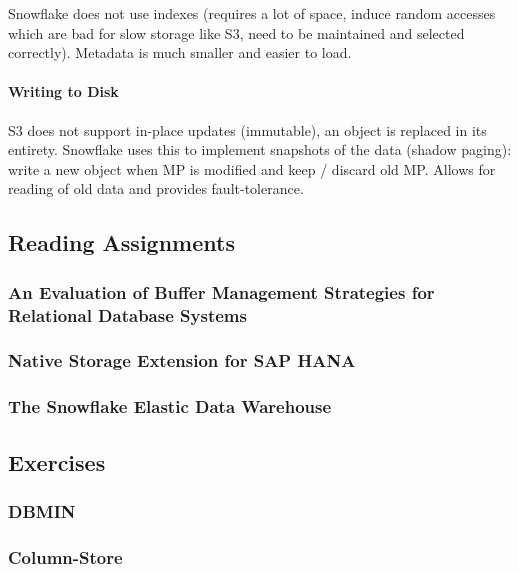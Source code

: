 Snowflake does not use indexes (requires a lot of space, induce random accesses which are bad for slow storage like S3, need to be maintained and selected correctly). Metadata is much smaller and easier to load.

\paragraph{Writing to Disk}
S3 does not support in-place updates (immutable), an object is replaced in its entirety. Snowflake uses this to implement snapshots of the data (shadow paging): write a new object when MP is modified and keep / discard old MP. Allows for reading of old data and provides fault-tolerance.



\subsection{Reading Assignments}

\subsubsection{An Evaluation of Buffer Management Strategies for Relational Database Systems}

\subsubsection{Native Storage Extension for SAP HANA}

\subsubsection{The Snowflake Elastic Data Warehouse}

\subsection{Exercises}

\subsubsection{DBMIN}

\subsubsection{Column-Store}